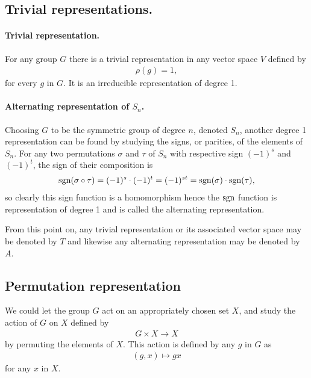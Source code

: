 \subsection{Trivial representations.}

\paragraph{Trivial representation.}


		For any group $G$ there is a trivial representation in any vector space $V$ defined by 
	\begin{align}
		\rho(g) = 1,
	\end{align}
	for every $g$ in $G$. It is an irreducible representation of degree 1. 

\paragraph{Alternating representation of $S_n$.}

	Choosing $G$ to be the symmetric group of degree $n$, denoted $S_n$, another degree 1 representation can be found by studying the signs, or parities, of the elements of $S_n$. For any two permutations $\sigma$ and $\tau$ of $S_n$ with respective sign $(-1)^s$ and $(-1)^t$, the sign of their composition is 
	\begin{align}
		\text{sgn}(\sigma \circ \tau) = (-1)^s \cdot (-1)^t = (-1)^{st} = \text{sgn}(\sigma) \cdot \text{sgn}(\tau),
	\end{align}
	so clearly this sign function is a homomorphism hence the $\text{sgn}$ function is representation of degree 1 and is called the alternating representation.	

\begin{notation}
	From this point on, any trivial representation or its associated vector space may be denoted by $T$ and likewise any alternating representation may be denoted by $A$.
\end{notation}
	

\subsection{Permutation representation}

	We could let the group $G$ act on an appropriately chosen set $X$, and study the action of $G$ on $X$ defined by
	\begin{align}
		G \times X \rightarrow X
	\end{align} 
	by permuting the elements of $X$. This action is defined by any $g$ in $G$ as 
	\begin{align}
		(g,x) \mapsto gx
	\end{align}
	for any $x$ in $X$.
	
